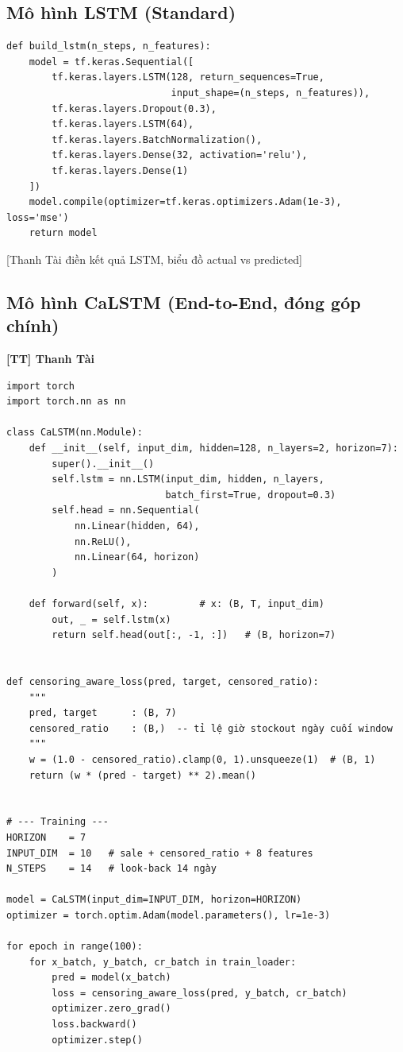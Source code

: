 \documentclass[12pt,a4paper]{report}
\newcommand{\ownerTT}{\colorbox{red!15}{\textbf{[TT] Thanh Tài}}}
\begin{document}
\subsection{Mô hình LSTM (Standard)}

\begin{lstlisting}[caption=Kiến trúc LSTM Stacked cho dự báo nhu cầu]
def build_lstm(n_steps, n_features):
    model = tf.keras.Sequential([
        tf.keras.layers.LSTM(128, return_sequences=True,
                             input_shape=(n_steps, n_features)),
        tf.keras.layers.Dropout(0.3),
        tf.keras.layers.LSTM(64),
        tf.keras.layers.BatchNormalization(),
        tf.keras.layers.Dense(32, activation='relu'),
        tf.keras.layers.Dense(1)
    ])
    model.compile(optimizer=tf.keras.optimizers.Adam(1e-3), loss='mse')
    return model
\end{lstlisting}

[Thanh Tài điền kết quả LSTM, biểu đồ actual vs predicted]

\subsection{Mô hình CaLSTM (End-to-End, đóng góp chính)}
\ownerTT

\begin{lstlisting}[caption=CaLSTM --- Censoring-Aware LSTM]
import torch
import torch.nn as nn

class CaLSTM(nn.Module):
    def __init__(self, input_dim, hidden=128, n_layers=2, horizon=7):
        super().__init__()
        self.lstm = nn.LSTM(input_dim, hidden, n_layers,
                            batch_first=True, dropout=0.3)
        self.head = nn.Sequential(
            nn.Linear(hidden, 64),
            nn.ReLU(),
            nn.Linear(64, horizon)
        )

    def forward(self, x):         # x: (B, T, input_dim)
        out, _ = self.lstm(x)
        return self.head(out[:, -1, :])   # (B, horizon=7)


def censoring_aware_loss(pred, target, censored_ratio):
    """
    pred, target      : (B, 7)
    censored_ratio    : (B,)  -- tỉ lệ giờ stockout ngày cuối window
    """
    w = (1.0 - censored_ratio).clamp(0, 1).unsqueeze(1)  # (B, 1)
    return (w * (pred - target) ** 2).mean()


# --- Training ---
HORIZON    = 7
INPUT_DIM  = 10   # sale + censored_ratio + 8 features
N_STEPS    = 14   # look-back 14 ngày

model = CaLSTM(input_dim=INPUT_DIM, horizon=HORIZON)
optimizer = torch.optim.Adam(model.parameters(), lr=1e-3)

for epoch in range(100):
    for x_batch, y_batch, cr_batch in train_loader:
        pred = model(x_batch)
        loss = censoring_aware_loss(pred, y_batch, cr_batch)
        optimizer.zero_grad()
        loss.backward()
        optimizer.step()
\end{lstlisting}
\end{document}

